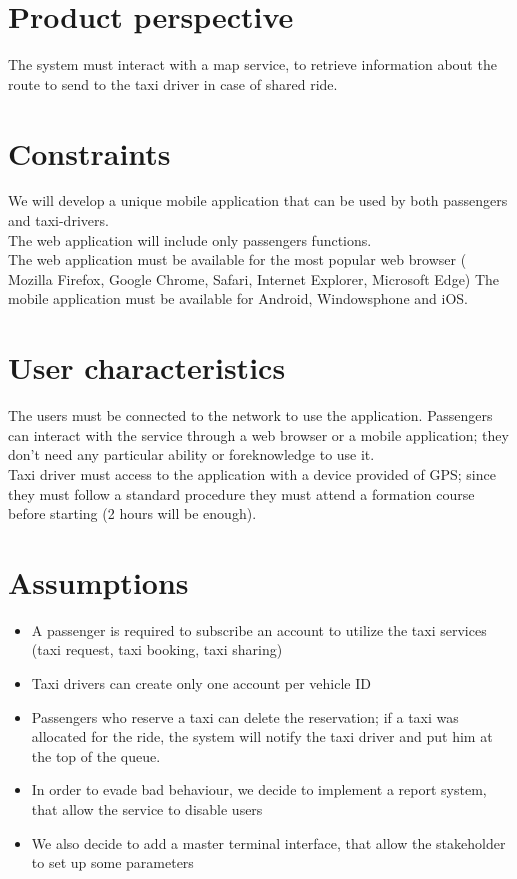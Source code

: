 \section{Product perspective}
The system must interact with a map service, to retrieve information about the route to send to the taxi driver in case of shared ride.


\section{Constraints}
We will develop a unique mobile application that can be used by both passengers and taxi-drivers.\\
The web application will include only passengers functions.\\
The web application must be available for the most popular web browser ( Mozilla Firefox, Google Chrome, Safari, Internet Explorer, Microsoft Edge)
The mobile application must be available for Android, Windowsphone and iOS.\\


\section{User characteristics}
The users must be connected to the network to use the application.
Passengers can interact with the service through a web browser or a mobile application; they don't need any particular 
ability or foreknowledge to use it.\\
Taxi driver must access to the application with a device provided of GPS; since they must follow a standard procedure 
they must attend a formation course before starting (2 hours will be enough).\\


\section{Assumptions}
\begin{itemize}
  \item A passenger is required to subscribe an account to utilize the taxi services (taxi request, taxi booking, taxi sharing)
  \item Taxi drivers can create only one account per vehicle ID
  \item Passengers who reserve a taxi can delete the reservation; if a taxi was allocated for the ride, 
  the system will notify the taxi driver and put him at the top of the queue.
  \item In order to evade bad behaviour, we decide to implement a report system, that allow the service to disable users
  \item We also decide to add a master terminal interface, that allow the stakeholder to set up some parameters
\end{itemize} 

